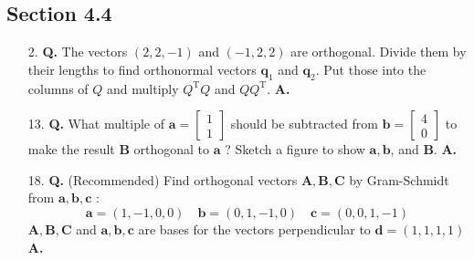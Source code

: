 \documentclass[main.tex]{subfiles}
\begin{document}
\subsection{Section 4.4}
\begin{enumerate}
    \item [2.] \textbf{Q.} The vectors $(2,2,-1)$ and $(-1,2,2)$ are orthogonal. Divide them by their lengths to find orthonormal vectors $\bm{q}_{1}$ and $\bm{q}_{2}$. Put those into the columns of $Q$ and multiply $Q^{\mathrm{T}} Q$ and $Q Q^{\mathrm{T}}$. \textbf{A.}
    
    \item [13.] \textbf{Q.} What multiple of $\bm{a}=\left[\begin{array}{l}1 \\ 1\end{array}\right]$ should be subtracted from $\boldsymbol{b}=\left[\begin{array}{l}4 \\ 0\end{array}\right]$ to make the result $\boldsymbol{B}$ orthogonal to $\boldsymbol{a}$ ? Sketch a figure to show $\boldsymbol{a}, \boldsymbol{b}$, and $\boldsymbol{B}$. \textbf{A.}
    
    \item [18.] \textbf{Q.} (Recommended) Find orthogonal vectors $\boldsymbol{A}, \boldsymbol{B}, \boldsymbol{C}$ by Gram-Schmidt from $\boldsymbol{a}, \boldsymbol{b}, \boldsymbol{c}$ :
    $$
    \boldsymbol{a}=(1,-1,0,0) \quad \boldsymbol{b}=(0,1,-1,0) \quad \boldsymbol{c}=(0,0,1,-1)
    $$
    $\boldsymbol{A}, \boldsymbol{B}, \boldsymbol{C}$ and $\boldsymbol{a}, \boldsymbol{b}, \boldsymbol{c}$ are bases for the vectors perpendicular to $\boldsymbol{d}=(1,1,1,1)$ \textbf{A.}
    
\end{enumerate}
\end{document}
